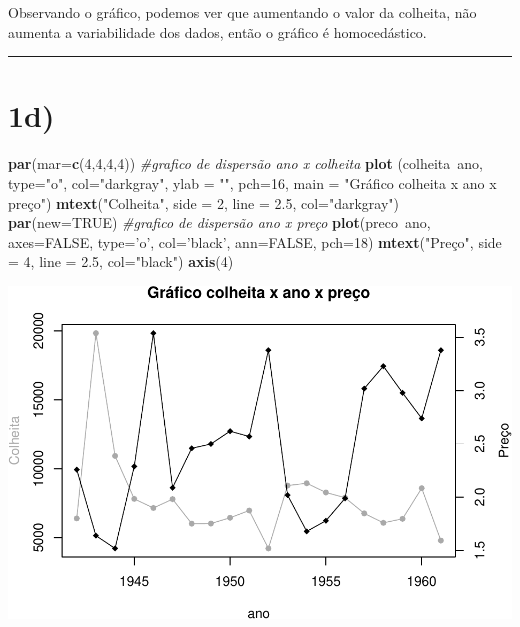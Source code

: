 \documentclass[11pt,]{article}
\makeatletter
\newenvironment{Shaded}{\begin{snugshade}}{\end{snugshade}}
\newcommand{\KeywordTok}[1]{\textcolor[rgb]{0.13,0.29,0.53}{\textbf{{#1}}}}
\newcommand{\DataTypeTok}[1]{\textcolor[rgb]{0.13,0.29,0.53}{{#1}}}
\newcommand{\DecValTok}[1]{\textcolor[rgb]{0.00,0.00,0.81}{{#1}}}
\newcommand{\FloatTok}[1]{\textcolor[rgb]{0.00,0.00,0.81}{{#1}}}
\newcommand{\StringTok}[1]{\textcolor[rgb]{0.31,0.60,0.02}{{#1}}}
\newcommand{\CommentTok}[1]{\textcolor[rgb]{0.56,0.35,0.01}{\textit{{#1}}}}
\newcommand{\OtherTok}[1]{\textcolor[rgb]{0.56,0.35,0.01}{{#1}}}
\newcommand{\NormalTok}[1]{{#1}}
\def\maxwidth{\ifdim\Gin@nat@width>\linewidth\linewidth
\else\Gin@nat@width\fi}
\let\Oldincludegraphics\includegraphics
\renewcommand{\includegraphics}[1]{\Oldincludegraphics[width=\maxwidth]{#1}}
\makeatother
\begin{document}
Observando o gráfico, podemos ver que aumentando o valor da colheita,
não aumenta a variabilidade dos dados, então o gráfico é homocedástico.

\begin{center}\rule{0.5\linewidth}{\linethickness}\end{center}

\section{1d)}\label{d}

\begin{Shaded}
\begin{Highlighting}[]
\KeywordTok{par}\NormalTok{(}\DataTypeTok{mar=}\KeywordTok{c}\NormalTok{(}\DecValTok{4}\NormalTok{,}\DecValTok{4}\NormalTok{,}\DecValTok{4}\NormalTok{,}\DecValTok{4}\NormalTok{))}
\CommentTok{#grafico de dispersão ano x colheita}
\KeywordTok{plot} \NormalTok{(colheita~ano, }\DataTypeTok{type=}\StringTok{"o"}\NormalTok{, }\DataTypeTok{col=}\StringTok{"darkgray"}\NormalTok{, }\DataTypeTok{ylab =} \StringTok{""}\NormalTok{, }\DataTypeTok{pch=}\DecValTok{16}\NormalTok{,}
      \DataTypeTok{main =} \StringTok{"Gráfico colheita x ano x preço"}\NormalTok{)}
\KeywordTok{mtext}\NormalTok{(}\StringTok{"Colheita"}\NormalTok{, }\DataTypeTok{side =} \DecValTok{2}\NormalTok{, }\DataTypeTok{line =} \FloatTok{2.5}\NormalTok{, }\DataTypeTok{col=}\StringTok{"darkgray"}\NormalTok{)}
\KeywordTok{par}\NormalTok{(}\DataTypeTok{new=}\OtherTok{TRUE}\NormalTok{)}
\CommentTok{#grafico de dispersão ano x preço}
\KeywordTok{plot}\NormalTok{(preco~ano, }\DataTypeTok{axes=}\OtherTok{FALSE}\NormalTok{, }\DataTypeTok{type=}\StringTok{'o'}\NormalTok{, }\DataTypeTok{col=}\StringTok{'black'}\NormalTok{, }\DataTypeTok{ann=}\OtherTok{FALSE}\NormalTok{, }\DataTypeTok{pch=}\DecValTok{18}\NormalTok{)}
\KeywordTok{mtext}\NormalTok{(}\StringTok{"Preço"}\NormalTok{, }\DataTypeTok{side =} \DecValTok{4}\NormalTok{, }\DataTypeTok{line =} \FloatTok{2.5}\NormalTok{, }\DataTypeTok{col=}\StringTok{"black"}\NormalTok{)}
\KeywordTok{axis}\NormalTok{(}\DecValTok{4}\NormalTok{)}
\end{Highlighting}
\end{Shaded}

\includegraphics{versaofinal_lista3_files/figure-latex/unnamed-chunk-5-1.pdf}
\end{document}
